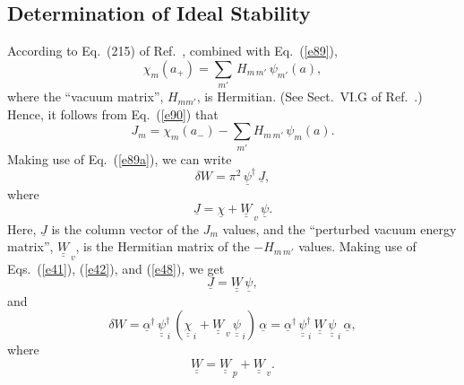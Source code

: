 \documentclass[12pt,prb,aps]{revtex4-1}
\begin{document}
\subsection{Determination of Ideal Stability}\label{stab}
According to Eq.~(215) of Ref.~, combined with Eq.~(\ref{e89}), 
\begin{equation}
\chi_m(a_+)=\sum_{m'}\,H_{m\,m'}\,\psi_{m'}(a),
\end{equation}
where the ``vacuum matrix'', $H_{mm'}$, is Hermitian. (See Sect.~VI.G of Ref.~.)
Hence, it follows from Eq.~(\ref{e90}) that
\begin{equation}
J_m = \chi_m(a_-)-\sum_{m'} H_{m\,m'}\,\psi_m(a).
\end{equation}
Making use of Eq.~(\ref{e89a}), we can write
\begin{equation}
\delta W =\pi^2\, \underline{\psi}^\dag\,\underline{J},
\end{equation}
where 
\begin{equation}
\underline{J} = \underline{\chi}+ \underline{\underline{W}}_{\,v}\,\underline{\psi}.
\end{equation}
Here,  $\underline{J}$ is the column vector of the $J_m$ values, 
and the ``perturbed vacuum energy matrix'', $\underline{\underline{W}}_{\,v}$,  is the Hermitian matrix of the $-H_{m\,m'}$ values. 
Making use of Eqs.~(\ref{e41}), (\ref{e42}), and (\ref{e48}), we get 
\begin{equation}
\underline{J} = \underline{\underline{W}}\,\underline{\psi},
\end{equation}
and
\begin{equation}
\delta W = \underline{\alpha}^\dag\,\underline{\underline{\psi}}^{\dag}_{\,i}\,(\underline{\underline{\chi}}_{\,i} + \underline{\underline{W}}_{\,v}\,\underline{\underline{\psi}}_{\,i})\,\underline{\alpha}=  \underline{\alpha}^\dag\,\underline{\underline{\psi}}^{\dag}_{\,i}\,\underline{\underline{W}}\,\underline{\underline{\psi}}_{\,i}\,\underline{\alpha},
\end{equation}
where
\begin{equation}
\underline{\underline{W}}=\underline{\underline{W}}_{\,p}+\underline{\underline{W}}_{\,v}.
\end{equation}
\end{document}
